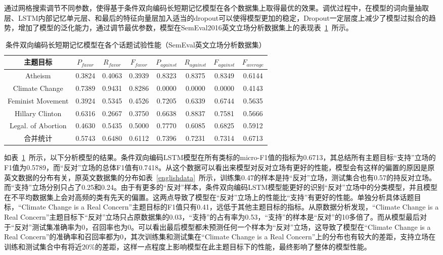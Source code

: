 通过网格搜索调节不同参数，使得基于条件双向编码长短期记忆模型在各个数据集上取得最优的效果。调优过程中，在模型的词向量抽取层、LSTM内部记忆单元层、和最后的特征向量层加入适当的dropout可以使得模型更加的稳定，Dropout一定层度上减少了模型过拟合的趋势，增加了模型的泛化能力，通过调节最优参数，模型在SemEval2016英文立场分析数据集上的表现表~\ref{conditional_semeval}~所示。
\begin{table}[htbp]
	\caption[table123]{条件双向编码长短期记忆模型在各个话题试验性能（SemEval英文立场分析数据集）}
	\label{conditional_semeval}
	\vspace{0.5em}\centering\wuhao
	\begin{tabular}{cccccccc}
		\toprule[1.5pt]
		主题目标& $P_{favor}$&$R_{favor}$&$F_{favor}$&$P_{against}$&$R_{against}$&$F_{against}$&$F_{average}$ \\
		\midrule[1pt]
		Atheism&0.3824&0.4063&0.3939&0.8323&0.8375&0.8349&0.6144\\
		Climate Change&0.7389&0.9431&0.8286&0.0000&0.0000&0.0000&0.4143\\
		Feminist Movement&0.3924&0.5345&0.4526&0.7205&0.6339&0.6744&0.5635\\
		Hillary Clinton&0.6316&0.2667&0.3750&0.6638&0.8837&0.7581&0.5666\\
		Legal. of Abortion&0.4630&0.5435&0.5000&0.7770&0.6085&0.6825&0.5912\\
		合并统计&0.5743&0.6480&0.6112&0.7396&0.7231&0.7314&0.6713\\
		\bottomrule[1.5pt]
	\end{tabular}
\end{table}

如表~\ref{conditional_semeval}~所示，以下分析模型的结果。条件双向编码LSTM模型在所有类标的micro-F1值的指标为0.6713，其总结所有主题目标“支持”立场的F1值为0.5789，而“反对”立场的总体F1值有0.7418。从这个数据可以看出来模型对反对立场有更好的性能，模型会有这样的偏置的原因是原英文数据的分布有关，原英文数据集的分布如表~\ref{englishdata}~所示，训练集0.47的样本是持“反对”立场，测试集合也有0.57的持反对立场。而“支持”立场分别只占了0.25和0.24。由于有更多的“反对”样本，条件双向编码LSTM模型能更好的识别“反对”立场中的分类模型，并且模型在不平均数据集上会对高频的类有先天的偏置。这两点导致了模型在“反对”立场上的性能比“支持”有更好的性能。单独分析具体话题目标，“Climate Change is a Real Concern”主题目标的F1值只有0.41，远低于其他主题目标的指标。从原数据分析发现，“Climate Change is a Real Concern”主题目标下“反对”立场只占原数据集的0.03，“支持”的占有率为0.53，“支持”的样本是“反对”的10多倍了。而从模型最后对于“反对”测试集准确率为0，召回率也为0。可以看出最后模型都未预测任何一个样本为“反对”立场，这导致了模型在“Climate Change is a Real Concern”的准确率和召回率都为0，其次训练集和测试集在“Climate Change is a Real Concern”上的分布也有较大的差距，支持立场在训练和测试集合中有将近20\%的差距，这样一点程度上影响模型在此主题目标下的性能，最终影响了整体的模型性能。

